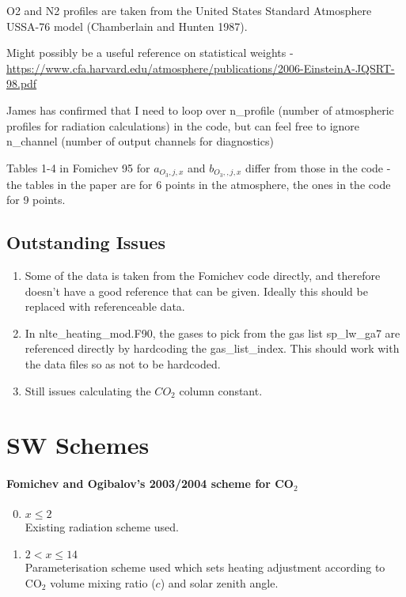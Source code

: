 O2 and N2 profiles are taken from the United States Standard Atmosphere
USSA-76 model (Chamberlain and Hunten 1987).

Might possibly be a useful reference on statistical weights - \\
\url{https://www.cfa.harvard.edu/atmosphere/publications/2006-EinsteinA-JQSRT-98.pdf}

James has confirmed that I need to loop over n\_profile (number of
atmospheric profiles for radiation calculations) in the code, but can
feel free to ignore n\_channel (number of output channels for
diagnostics)


Tables 1-4 in Fomichev 95 for $a_{O_3,j,x}$ and $b_{O_3,,j,x}$ differ
from those in the code - the tables in the paper are for 6 points in
the atmosphere, the ones in the code for 9 points.

\subsection{Outstanding Issues}

\begin{enumerate}
\item Some of the data is taken from the Fomichev code directly, and
  therefore doesn't have a good reference that can be given. Ideally 
  this should be replaced with referenceable data.
\item In nlte\_heating\_mod.F90, the gases to pick from the gas list
  sp\_lw\_ga7 are referenced directly by hardcoding the
  gas\_list\_index.  This should work with the data files so as not to
  be hardcoded.
\item Still issues calculating the $CO_2$ column constant.
\end{enumerate}

\section{SW Schemes}

\paragraph{Fomichev and Ogibalov's 2003/2004 scheme for CO$_2$}
\begin{enumerate}
\setcounter{enumi}{-1}

\item $x \leq 2$ \\
  Existing radiation scheme used.
\item  $2 < x \leq 14$ \\
   Parameterisation scheme used which sets heating adjustment according 
   to CO$_2$ volume mixing ratio ($c$) and solar zenith angle. \\ 
\end{enumerate}

